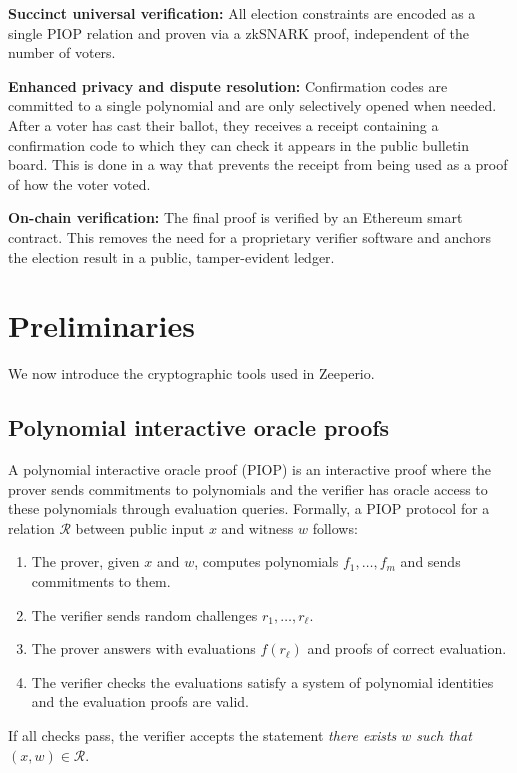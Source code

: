 \begin{description} 
\item \textbf{Succinct universal verification:} All election constraints are encoded as a single PIOP relation and proven via a zkSNARK proof, independent of the number of voters.
\item \textbf{Enhanced privacy and dispute resolution:}
  Confirmation codes are committed to a single polynomial and are only selectively opened when needed.
  After a voter has cast their ballot, they receives a receipt containing a confirmation code to which they can check it appears in the public bulletin board. 
 This is done in a way that prevents the receipt from being used as a proof of how the voter voted.
  \item \textbf{On-chain verification:}
  The final proof is verified by an Ethereum smart contract. This removes the need for a proprietary verifier software and anchors the election result in a public, tamper-evident ledger.
\end{description}




\section{Preliminaries}

We now introduce the cryptographic tools used in Zeeperio.

\subsection{Polynomial interactive oracle proofs}

A polynomial interactive oracle proof (PIOP) is an interactive proof where the prover sends commitments to polynomials and the verifier has oracle access to these polynomials through evaluation queries.
Formally, a PIOP protocol for a relation $\mathcal{R}$ between public input $x$ and witness $w$ follows:
\begin{enumerate}[label=(\roman*)]
  \item The prover, given $x$ and $w$, computes polynomials $f_1,\dots,f_m$ and sends commitments to them.
  \item The verifier sends random challenges $r_1,\dots,r_\ell$.
  \item The prover answers with evaluations $f(r_\ell)$ and proofs of correct evaluation.
  \item The verifier checks the evaluations satisfy a system of polynomial identities and the evaluation proofs are valid.
\end{enumerate}
If all checks pass, the verifier accepts the statement \emph{there exists $w$ such that $(x,w) \in \mathcal{R}$}.

